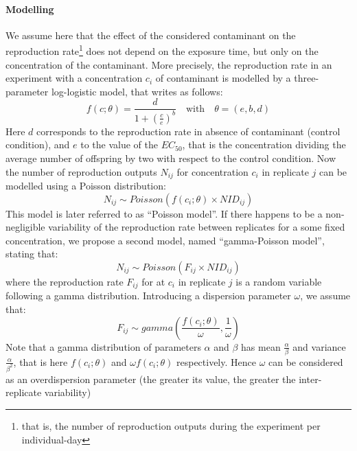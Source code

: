 \documentclass{article}
\begin{document}
\paragraph{Modelling} We assume here that the effect of the considered
contaminant on the reproduction rate\footnote{that is, the number of
  reproduction outputs during the experiment per individual-day} does
not depend on the exposure time, but only on the concentration of the
contaminant. More precisely, the reproduction rate in an
experiment with a concentration $c_i$ of contaminant is modelled by a
three-parameter log-logistic model, that writes as follows:
\[
f(c;\theta)=\frac{d}{1+(\frac{c}{e})^b} \quad \textrm{with} \quad
\theta=(e,b,d)
\]
Here $d$ corresponds to the reproduction rate in absence of
contaminant (control condition), and $e$ to the value of the
$EC_{50}$, that is the concentration dividing the average number of
offspring by two with respect to the control condition.  Now the
number of reproduction outputs $N_{ij}$ for concentration $c_i$ in
replicate $j$ can be modelled using a Poisson distribution:
$$
N_{ij} \sim Poisson(f(c_i ; \theta) \times NID_{ij})
$$
This model is later referred to as ``Poisson model''.  If there
happens to be a non-negligible variability of the reproduction rate
between replicates for a some fixed concentration, we propose a second
model, named ``gamma-Poisson model'', stating that:
$$
N_{ij} \sim Poisson(F_{ij} \times NID_{ij})
$$
where the reproduction rate $F_{ij}$ for at $c_i$ in replicate $j$ is
a random variable following a gamma distribution. Introducing a
dispersion parameter $\omega$, we assume that:
$$
F_{ij} \sim gamma(\frac{f(c_i;\theta)}{\omega}, \frac{1}{\omega})
$$
Note that a gamma distribution of parameters $\alpha$ and $\beta$ has
mean $\frac{\alpha}{\beta}$ and variance $\frac{\alpha}{\beta^2}$,
that is here $f(c_i;\theta)$ and $\omega f(c_i;\theta)$
respectively. Hence $\omega$ can be considered as an overdispersion
parameter (the greater its value, the greater the inter-replicate
variability)
\end{document}
